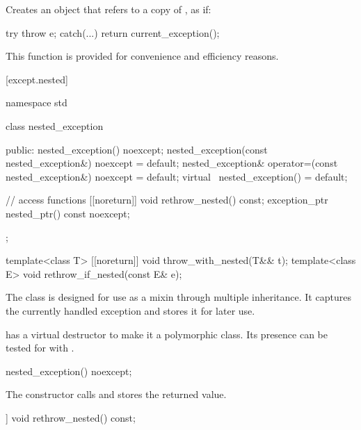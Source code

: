 \begin{itemdescr}
\pnum
\effects
Creates an  object that refers to a copy of , as if:
\begin{codeblock}
try {
  throw e;
} catch(...) {
  return current_exception();
}
\end{codeblock}

\pnum
\begin{note}
This function is provided for convenience and
efficiency reasons.
\end{note}
\end{itemdescr}

[except.nested]{}

%
\begin{codeblock}
namespace std {
  class nested_exception {
  public:
    nested_exception() noexcept;
    nested_exception(const nested_exception&) noexcept = default;
    nested_exception& operator=(const nested_exception&) noexcept = default;
    virtual ~nested_exception() = default;

    // access functions
    [[noreturn]] void rethrow_nested() const;
    exception_ptr nested_ptr() const noexcept;
  };

  template<class T> [[noreturn]] void throw_with_nested(T&& t);
  template<class E> void rethrow_if_nested(const E& e);
}
\end{codeblock}

\pnum
The class  is designed for use as a mixin through
multiple inheritance. It captures the currently handled exception and stores it
for later use.

\pnum
\begin{note}
 has a virtual destructor to make it a
polymorphic class. Its presence can be tested for with .
\end{note}

%
\begin{itemdecl}
nested_exception() noexcept;
\end{itemdecl}

\begin{itemdescr}
\pnum
\effects
The constructor calls  and stores the returned value.
\end{itemdescr}

%
\begin{itemdecl}
[[noreturn]] void rethrow_nested() const;
\end{itemdecl}

